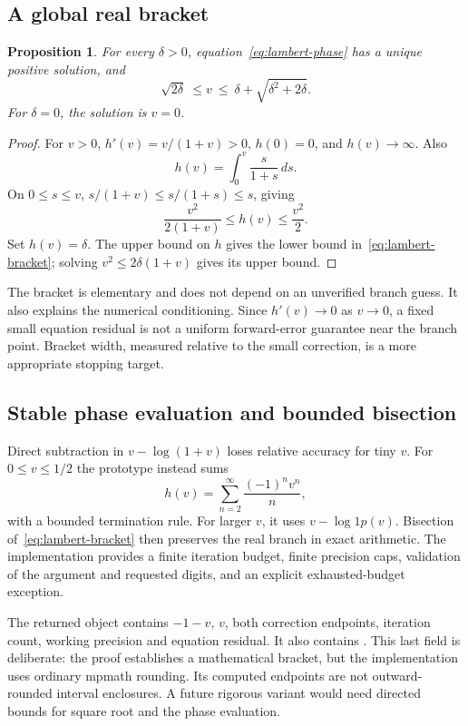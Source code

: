 \documentclass[11pt,letterpaper]{article}
\newcommand{\code}[1]{\texttt{\detokenize{#1}}}
\newtheorem{proposition}{Proposition}[section]
\begin{document}
\subsection{A global real bracket}
\begin{proposition}
For every $\delta>0$, equation~\eqref{eq:lambert-phase} has a unique positive solution, and
\begin{equation}
 \sqrt{2\delta}\ \le v\ \le\ \delta+\sqrt{\delta^2+2\delta}.
 \label{eq:lambert-bracket}
\end{equation}
For $\delta=0$, the solution is $v=0$.
\end{proposition}
\begin{proof}
For $v>0$, $h'(v)=v/(1+v)>0$, $h(0)=0$, and $h(v)\to\infty$. Also
\[
 h(v)=\int_0^v\frac{s}{1+s}\,ds.
\]
On $0\le s\le v$,
$s/(1+v)\le s/(1+s)\le s$, giving
\[
 \frac{v^2}{2(1+v)}\le h(v)\le\frac{v^2}{2}.
\]
Set $h(v)=\delta$. The upper bound on $h$ gives the lower bound in~\eqref{eq:lambert-bracket}; solving $v^2\le2\delta(1+v)$ gives its upper bound.
\end{proof}

The bracket is elementary and does not depend on an unverified branch guess. It also explains the numerical conditioning. Since $h'(v)\to0$ as $v\to0$, a fixed small equation residual is not a uniform forward-error guarantee near the branch point. Bracket width, measured relative to the small correction, is a more appropriate stopping target.

\subsection{Stable phase evaluation and bounded bisection}
Direct subtraction in $v-\log(1+v)$ loses relative accuracy for tiny $v$. For $0\le v\le1/2$ the prototype instead sums
\[
 h(v)=\sum_{n=2}^{\infty}\frac{(-1)^n v^n}{n},
\]
with a bounded termination rule. For larger $v$, it uses $v-\log1p(v)$. Bisection of~\eqref{eq:lambert-bracket} then preserves the real branch in exact arithmetic. The implementation provides a finite iteration budget, finite precision caps, validation of the argument and requested digits, and an explicit exhausted-budget exception.

The returned object contains $-1-v$, $v$, both correction endpoints, iteration count, working precision and equation residual. It also contains \code{certified=False}. This last field is deliberate: the proof establishes a mathematical bracket, but the implementation uses ordinary mpmath rounding. Its computed endpoints are not outward-rounded interval enclosures. A future rigorous variant would need directed bounds for square root and the phase evaluation.
\end{document}
